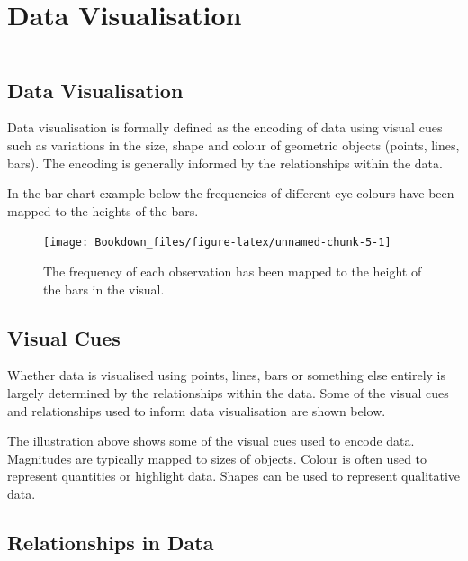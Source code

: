 \documentclass[
]{book}
\begin{document}
\hypertarget{data-visualisation}{%
\chapter{Data Visualisation}\label{data-visualisation}}

\begin{center}\rule{0.5\linewidth}{0.5pt}\end{center}

\hypertarget{data-visualisation-1}{%
\section{Data Visualisation}\label{data-visualisation-1}}

Data visualisation is formally defined as the encoding of data using visual cues such as variations in the size, shape and colour of geometric objects (points, lines, bars). The encoding is generally informed by the relationships within the data.

In the bar chart example below the frequencies of different eye colours have been mapped to the heights of the bars.

\begin{figure}

{\centering \texttt{[image: Bookdown\_files/figure-latex/unnamed-chunk-5-1]} 

}

\caption{The frequency of each observation has been mapped to the height of the bars in the visual.}\label{fig:unnamed-chunk-5}
\end{figure}

\hypertarget{visual-cues}{%
\section{Visual Cues}\label{visual-cues}}

Whether data is visualised using points, lines, bars or something else entirely is largely determined by the relationships within the data. Some of the visual cues and relationships used to inform data visualisation are shown below.

The illustration above shows some of the visual cues used to encode data. Magnitudes are typically mapped to sizes of objects. Colour is often used to represent quantities or highlight data. Shapes can be used to represent qualitative data.

\hypertarget{relationships-in-data}{%
\section{Relationships in Data}\label{relationships-in-data}}
\end{document}
